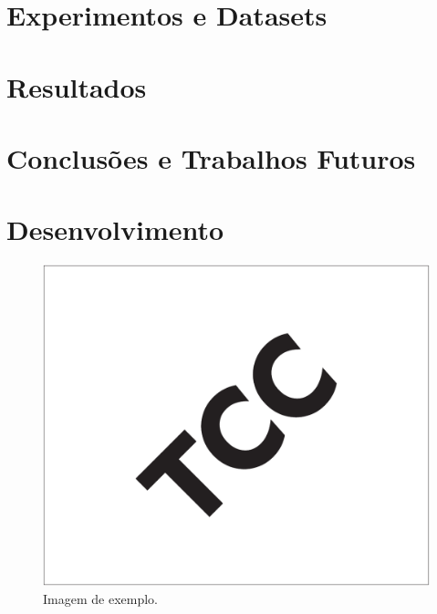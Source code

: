 \documentclass[12pt, %
openright, 
oneside, %
a4paper,    %
brazil]{facom-ufu-abntex2}
\begin{document}
\chapter{Experimentos e Datasets}

\chapter{Resultados}

\chapter{Conclusões e Trabalhos Futuros}








\chapter{Desenvolvimento}

\begin{figure}[!ht]
    \centering
  \includegraphics[width=0.55\linewidth]{imagemExemplo.pdf}
  \caption[Isso é o que aparece no sumário]{Imagem de exemplo.}
  \label{fig:graficosVariandoTamanhoRede}
\end{figure}
\end{document}
